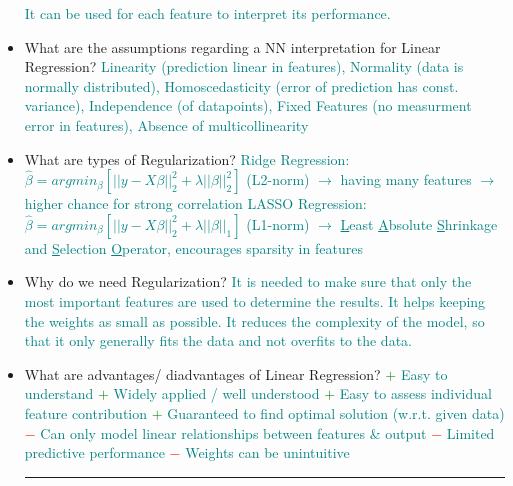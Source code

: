 \documentclass{report}
\newcommand{\asw}[2][teal]{}
\renewcommand{\asw}[2][teal]{\textcolor{#1}{#2}}
\begin{document}
\begin{itemize}
	\asw{\newline It can be used for each feature to interpret its performance.}
	\item What are the assumptions regarding a NN interpretation for Linear Regression?
	\asw{\newline Linearity (prediction linear in features),
		\newline Normality (data is normally distributed),
		\newline Homoscedasticity (error of prediction has const. variance),
		\newline Independence (of datapoints),
		\newline Fixed Features (no measurment error in features),
		\newline Absence of multicollinearity}
	\item What are types of Regularization?
	\asw{\newline Ridge Regression: $\hat{\beta} = argmin_\beta[||y - X\beta||^2_2 + \lambda ||\beta||^2_2]$ (L2-norm)
		\newline $\rightarrow$ having many features $\rightarrow$ higher chance for strong correlation
		\newline LASSO Regression: $\hat{\beta} = argmin_\beta[||y - X\beta||^2_2 + \lambda ||\beta||_1]$ (L1-norm)
		\newline $\rightarrow$ \underline{L}east \underline{A}bsolute \underline{S}hrinkage and \underline{S}election \underline{O}perator, encourages sparsity in features}
	\item Why do we need Regularization?
	\asw{\newline It is needed to make sure that only the most important features are used to determine the results. It helps keeping the weights as small as possible. It reduces the complexity of the model, so that it only generally fits the data and not overfits to the data.}
	\item What are advantages/ diadvantages of Linear Regression?
	\asw{\newline \textcolor{green}{$+$} Easy to understand
		\newline \textcolor{green}{$+$} Widely applied / well understood
		\newline \textcolor{green}{$+$} Easy to assess individual feature contribution
		\newline \textcolor{green}{$+$} Guaranteed to find optimal solution (w.r.t. given data)
		\newline \textcolor{red}{$-$} Can only model linear relationships between features \& output
		\newline \textcolor{red}{$-$} Limited predictive performance
		\newline \textcolor{red}{$-$} Weights can be unintuitive}
	\newline
	\hrule 
	

\end{itemize}
\end{document}
